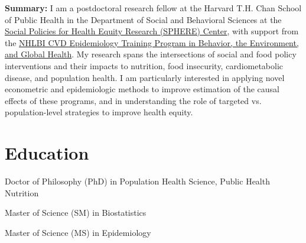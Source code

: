 \documentclass{cv_style}
\begin{document}
\begin{center}
\end{center}


\begin{adjustwidth}{0.7cm}{0.7cm} \parskip 8pt \begin{small} \textbf{Summary:} I am a postdoctoral research fellow at the Harvard T.H. Chan School of Public Health in the Department of Social and Behavioral Sciences at the \href{https://www.hsph.harvard.edu/sphere/}{Social Policies for Health Equity Research (SPHERE) Center}, with support from the \href{https://www.hsph.harvard.edu/cvdepi/predocpostdoc-training-program/}{NHLBI CVD Epidemiology Training Program in Behavior, the Environment, and Global Health}. My research spans the intersections of social and food policy interventions and their impacts to nutrition, food insecurity, cardiometabolic disease, and population health. I am particularly interested in applying novel econometric and epidemiologic methods to improve estimation of the causal effects of these programs, and in understanding the role of targeted vs. population-level strategies to improve health equity.  
\end{small}
\end{adjustwidth}


\parskip -5pt 
\section{Education}
\parskip -5pt
\parskip -4pt \noindent Doctor of Philosophy (PhD) in Population Health Science, Public Health Nutrition \\

\vspace{-1em}


\parskip -4pt \noindent Master of Science (SM) in Biostatistics

\parskip -4pt Master of Science (MS) in Epidemiology 
\end{document}
